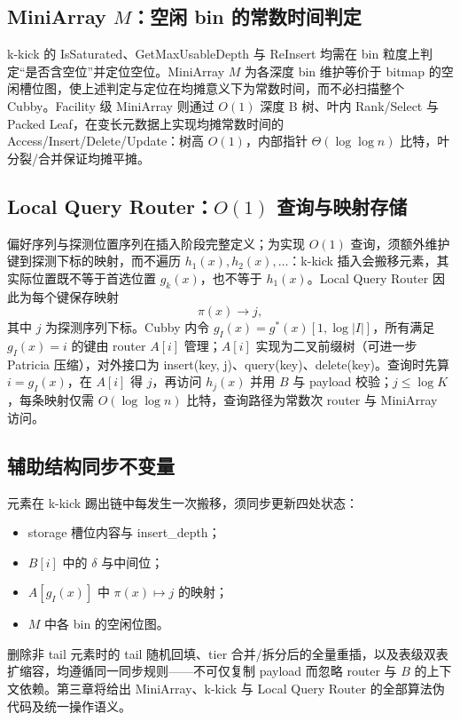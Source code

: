 \subsection{MiniArray \(M\)：空闲 bin 的常数时间判定}

k-kick 的 IsSaturated、GetMaxUsableDepth 与 ReInsert 均需在 bin 粒度上判定“是否含空位”并定位空位。MiniArray \(M\) 为各深度 bin 维护等价于 bitmap 的空闲槽位图，使上述判定与定位在均摊意义下为常数时间，而不必扫描整个 Cubby\cite{bender2022otsh,pagh2004linear}。Facility 级 MiniArray 则通过 \(O(1)\) 深度 B 树、叶内 Rank/Select 与 Packed Leaf，在变长元数据上实现均摊常数时间的 Access/Insert/Delete/Update\cite{bayer1972,jacobson1989,pagh2001}：树高 \(O(1)\)，内部指针 \(\Theta(\log\log n)\) 比特，叶分裂/合并保证均摊平摊\cite{kurpicz2023pachash,lehmann2024shockhash}。

\subsection{Local Query Router：\(O(1)\) 查询与映射存储}

偏好序列与探测位置序列在插入阶段完整定义；为实现 $O(1)$ 查询，须额外维护键到探测下标的映射，而不遍历 $h_1(x), h_2(x), \dots$：k-kick 插入会搬移元素，其实际位置既不等于首选位置 $g_k(x)$，也不等于 $h_1(x)$。Local Query Router 因此为每个键保存映射
\[
  \pi(x)\longrightarrow j,
\]
其中 \(j\) 为探测序列下标。Cubby 内令 \(g_I(x)=g^\ast(x)[1,\log|I|]\)，所有满足 \(g_I(x)=i\) 的键由 router \(A[i]\) 管理；\(A[i]\) 实现为二叉前缀树（可进一步 Patricia 压缩\cite{morrison1968,lehmann2025combined}），对外接口为 insert(key, j)、query(key)、delete(key)。查询时先算 \(i=g_I(x)\)，在 \(A[i]\) 得 \(j\)，再访问 \(h_j(x)\) 并用 \(B\) 与 payload 校验；\(j\le\log K\)，每条映射仅需 \(O(\log\log n)\) 比特，查询路径为常数次 router 与 MiniArray 访问\cite{bender2022otsh,pagh2008retrieval}。

\subsection{辅助结构同步不变量}

元素在 k-kick 踢出链中每发生一次搬移，须同步更新四处状态：
\begin{itemize}
  \item storage 槽位内容与 insert\_depth；
  \item \(B[i]\) 中的 \(\delta\) 与中间位；
  \item \(A[g_I(x)]\) 中 \(\pi(x)\mapsto j\) 的映射；
  \item \(M\) 中各 bin 的空闲位图。
\end{itemize}
删除非 tail 元素时的 tail 随机回填、tier 合并/拆分后的全量重插，以及表级双表扩缩容，均遵循同一同步规则——不可仅复制 payload 而忽略 router 与 \(B\) 的上下文依赖\cite{bender2022otsh,bender2024sosa}。第三章将给出 MiniArray、k-kick 与 Local Query Router 的全部算法伪代码及统一操作语义。

